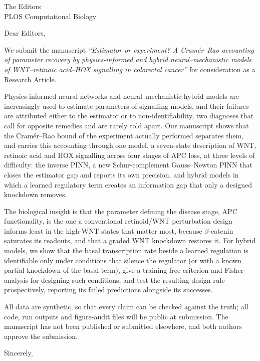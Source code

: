 \documentclass[11pt]{letter}
\begin{document}
\begin{letter}{The Editors\\PLOS Computational Biology}
\opening{Dear Editors,}

We submit the manuscript \emph{``Estimator or experiment? A Cram\'er--Rao
accounting of parameter recovery by physics-informed and hybrid
neural--mechanistic models of WNT--retinoic acid--HOX signalling in colorectal
cancer''} for consideration as a Research Article.

Physics-informed neural networks and neural--mechanistic hybrid models are
increasingly used to estimate parameters of signalling models, and their
failures are attributed either to the estimator or to non-identifiability, two
diagnoses that call for opposite remedies and are rarely told apart. Our
manuscript shows that the Cram\'er--Rao bound of the experiment actually
performed separates them, and carries this accounting through one model, a
seven-state description of WNT, retinoic acid and HOX signalling across four
stages of APC loss, at three levels of difficulty: the inverse PINN, a new
Schur-complement Gauss--Newton PINN that closes the estimator gap and reports
its own precision, and hybrid models in which a learned regulatory term creates
an information gap that only a designed knockdown removes.

The biological insight is that the parameter defining the disease stage, APC
functionality, is the one a conventional retinoid/WNT perturbation design
informs least in the high-WNT states that matter most, because
$\beta$-catenin saturates its readouts, and that a graded WNT knockdown restores
it. For hybrid models, we show that the basal transcription rate beside a
learned regulation is identifiable only under conditions that silence the
regulator (or with a known partial knockdown of the basal term), give a
training-free criterion and Fisher analysis for designing such conditions, and
test the resulting design rule prospectively, reporting its failed predictions
alongside its successes.

All data are synthetic, so that every claim can be checked against the truth;
all code, run outputs and figure-audit files will be public at submission. The
manuscript has not been published or submitted elsewhere, and both authors
approve the submission.

\closing{Sincerely,}
\end{letter}
\end{document}
